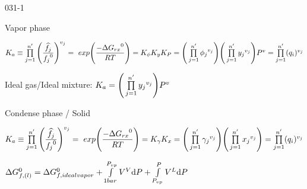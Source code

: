 \begin{mitframe}{031-1}
\begin{listone}
\begin{listtwo}
		\item Vapor phase
        
        \begin{listthree}
        
        	\item $\eqconst \equiv \prod\limits_{j=1}^{n'}\Bigg(\dfrac{\widehat{\fug}_{j}}{{\fug_{j}}^{\init}}\Bigg)^{\vvel_{j}}=~exp\Bigg(\dfrac{-\iipf{\gibbs_{rx}}^{\init}}{\gasconst\Temp}\Bigg)=\fugeqconst\yeqconst\peqconst=\Bigg(\prod\limits_{j=1}^{n'}{\fugcoeff_{j}}^{\vvel_{j}}\Bigg)\Bigg(\prod\limits_{j=1}^{n'}{y_{j}}^{\vvel_{j}}\Bigg)\p^{\vvel}=\prod\limits_{j=1}^{n'}(\heatflux_{\state})^{\vvel_{j}}$
            \begin{listfour}
            
            	\item Ideal gas/Ideal mixture: $\eqconst = \Bigg( \prod\limits_{j=1}^{n'}{y_{j}}^{\vvel_{j}}\Bigg)\p^{\vvel}$

			\end{listfour}

		\end{listthree}        
        
        \item Condense phase / Solid

        \begin{listthree}
        
        	\item $\eqconst \equiv \prod\limits_{j=1}^{n'}\Bigg(\dfrac{\widehat{\fug}_{j}}{{\fug_{j}}^{\init}}\Bigg)^{\vvel_{j}}=~exp\Bigg(\dfrac{-\iipf{\gibbs_{rx}}^{\init}}{\gasconst\Temp}\Bigg)=\acteqconst K_{x}=\Bigg(\prod\limits_{j=1}^{n'}{\gamma_{j}}^{\vvel_{j}}\Bigg)\Bigg(\prod\limits_{j=1}^{n'}{x_{j}}^{\vvel_{j}}\Bigg)=\prod\limits_{j=1}^{n'}(\heatflux_{\state})^{\vvel_{j}}$
            
            \begin{listfour}
            
            	\item $\iipf\gibbs_{\fug,(l)}^{\init}=\iipf\gibbs_{\fug,ideal vapor}^{\init}+\int\limits_{1bar}^{\p_{vp}}\vol^{\vol}\mathrm{d}\p+\int\limits_{\p_{vp}}^{\p}\vol^{L}\mathrm{d}\p$
                

\end{listfour}
\end{listthree}
\end{listtwo}
\end{listone}
\end{mitframe}
